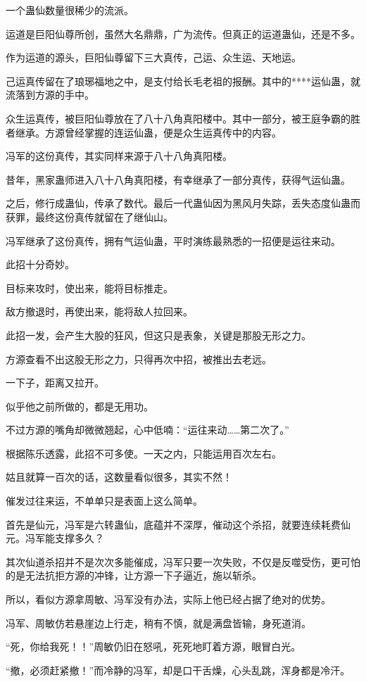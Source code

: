 \begin{this_body}
一个蛊仙数量很稀少的流派。

运道是巨阳仙尊所创，虽然大名鼎鼎，广为流传。但真正的运道蛊仙，还是不多。

作为运道的源头，巨阳仙尊留下三大真传，己运、众生运、天地运。

己运真传留在了琅琊福地之中，是支付给长毛老祖的报酬。其中的****运仙蛊，就流落到方源的手中。

众生运真传，被巨阳仙尊放在了八十八角真阳楼中。其中一部分，被王庭争霸的胜者继承。方源曾经掌握的连运仙蛊，便是众生运真传中的内容。

冯军的这份真传，其实同样来源于八十八角真阳楼。

昔年，黑家蛊师进入八十八角真阳楼，有幸继承了一部分真传，获得气运仙蛊。

之后，修行成蛊仙，传承了数代。最后一代蛊仙因为黑风月失踪，丢失态度仙蛊而获罪，最终这份真传就留在了继仙山。

冯军继承了这份真传，拥有气运仙蛊，平时演练最熟悉的一招便是运往来动。

此招十分奇妙。

目标来攻时，使出来，能将目标推走。

敌方撤退时，再使出来，能将敌人拉回来。

此招一发，会产生大股的狂风，但这只是表象，关键是那股无形之力。

方源查看不出这股无形之力，只得再次中招，被推出去老远。

一下子，距离又拉开。

似乎他之前所做的，都是无用功。

不过方源的嘴角却微微翘起，心中低喃：“运往来动……第二次了。”

根据陈乐透露，此招不可多使。一天之内，只能运用百次左右。

姑且就算一百次的话，这数量看似很多，其实不然！

催发过往来运，不单单只是表面上这么简单。

首先是仙元，冯军是六转蛊仙，底蕴并不深厚，催动这个杀招，就要连续耗费仙元。冯军能支撑多久？

其次仙道杀招并不是次次多能催成，冯军只要一次失败，不仅是反噬受伤，更可怕的是无法抗拒方源的冲锋，让方源一下子逼近，施以斩杀。

所以，看似方源拿周敏、冯军没有办法，实际上他已经占据了绝对的优势。

冯军、周敏仿若悬崖边上行走，稍有不慎，就是满盘皆输，身死道消。

“死，你给我死！！”周敏仍旧在怒吼，死死地盯着方源，眼冒白光。

“撤，必须赶紧撤！”而冷静的冯军，却是口干舌燥，心头乱跳，浑身都是冷汗。

\end{this_body}


